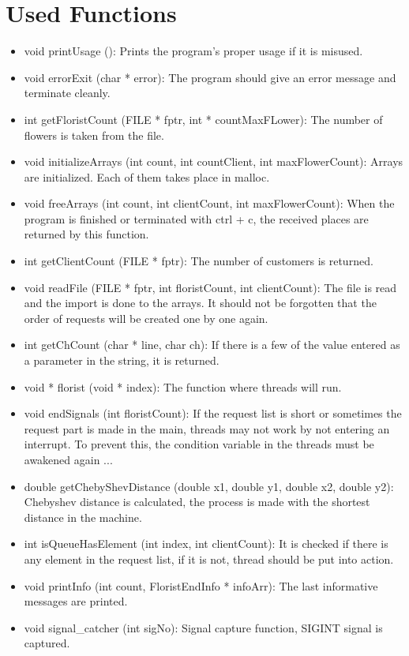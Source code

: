 \documentclass{article}
\begin{document}
\section{Used Functions}
\begin{itemize}
    \item void printUsage (): Prints the program's proper usage if it is misused.
    \item void errorExit (char * error): The program should give an error message and terminate cleanly.
    \item int getFloristCount (FILE * fptr, int * countMaxFLower): The number of flowers is taken from the file.
    \item void initializeArrays (int count, int countClient, int maxFlowerCount): Arrays are initialized. Each of them takes place in malloc.
    \item void freeArrays (int count, int clientCount, int maxFlowerCount): When the program is finished or terminated with ctrl + c, the received places are returned by this function.
    \item int getClientCount (FILE * fptr): The number of customers is returned.
    \item void readFile (FILE * fptr, int floristCount, int clientCount): The file is read and the import is done to the arrays. It should not be forgotten that the order of requests will be created one by one again.
    \item int getChCount (char * line, char ch): If there is a few of the value entered as a parameter in the string, it is returned.
    \item void * florist (void * index): The function where threads will run.
    \item void endSignals (int floristCount): If the request list is short or sometimes the request part is made in the main, threads may not work by not entering an interrupt. To prevent this, the condition variable in the threads must be awakened again ...
    \item double getChebyShevDistance (double x1, double y1, double x2, double y2): Chebyshev distance is calculated, the process is made with the shortest distance in the machine.
    \item int isQueueHasElement (int index, int clientCount): It is checked if there is any element in the request list, if it is not, thread should be put into action.
    \item void printInfo (int count, FloristEndInfo * infoArr): The last informative messages are printed.
    \item void signal\_catcher (int sigNo): Signal capture function, SIGINT signal is captured.
\end{itemize}
\end{document}

